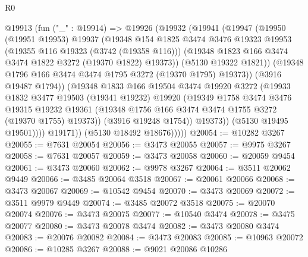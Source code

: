 \begin{lexlean}{R0}
\begin{coremodule}
                  @19913
                    (fun ("_" : @19914) =>
                    @19926
                      (@19932
                        (@19941
                          (@19947
                            (@19950
                              (@19951 @19953)
                              @19937
                              (@19348
                                @154
                                @1825
                                @3474
                                @3476
                                @19323
                                @19953
                                (@19355 @116 @19323 (@3742 (@19358 @116)))
                                (@19348 @1823 @166 @3474 @3474 @1822 @3272 (@19370 @1822) @19373))
                              (@5130 @19322 @1821))
                            (@19348 @1796 @166 @3474 @3474 @1795 @3272 (@19370 @1795) @19373))
                          (@3916 @19487 @1794))
                        (@19348
                          @1833
                          @166
                          @19504
                          @3474
                          @19920
                          @3272
                          (@19933
                            @1832
                            @3477
                            @19503
                            (@19341 @19232)
                            @19920
                            (@19349
                              @1758
                              @3474
                              @3476
                              @19315
                              @19232
                              @19361
                              (@19348 @1756 @166 @3474 @3474 @1755 @3272 (@19370 @1755) @19373))
                            (@3916 @19248 @1754))
                          @19373))
                      (@5130 @19495 @19501))))
                @19171))
            (@5130 @18492 @18676)))))
@20054 := @10282 @3267
@20055 := @7631 @20054
@20056 := @3473 @20055
@20057 := @9975 @3267
@20058 := @7631 @20057
@20059 := @3473 @20058
@20060 := @20059 @9454
@20061 := @3473 @20060
@20062 := @9978 @3267
@20064 := @3511 @20062 @9449
@20066 := @3485 @20064 @3518
@20067 := @20061 @20066
@20068 := @3473 @20067
@20069 := @10542 @9454
@20070 := @3473 @20069
@20072 := @3511 @9979 @9449
@20074 := @3485 @20072 @3518
@20075 := @20070 @20074
@20076 := @3473 @20075
@20077 := @10540 @3474
@20078 := @3475 @20077
@20080 := @3473 @20078 @3474
@20082 := @3473 @20080 @3474
@20083 := @20076 @20082
@20084 := @3473 @20083
@20085 := @10963 @20072
@20086 := @10285 @3267
@20088 := @9021 @20086 @10286

\end{coremodule}
\end{lexlean}
